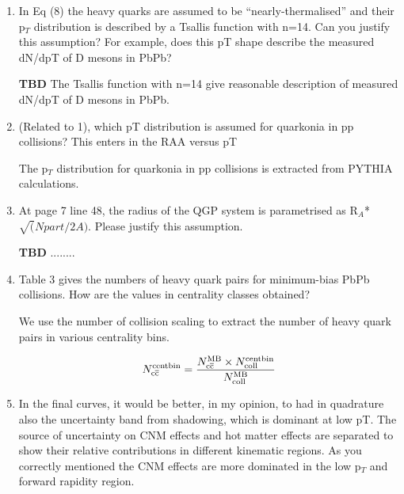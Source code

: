 \documentclass[a4paper,11pt]{article}
\begin{document}
\begin{enumerate}

\item In Eq (8) the heavy quarks are assumed to be “nearly-thermalised” and their p$_T$ distribution is described by a
  Tsallis function with n=14. Can you justify this assumption? For example, does this pT shape describe the measured dN/dpT
  of D mesons in PbPb?

{\color{red} \textbf{TBD} The Tsallis function with n=14 give reasonable description of measured dN/dpT
  of D mesons in PbPb. } 


\item (Related to 1), which pT distribution is assumed for quarkonia in pp collisions? This enters in the RAA versus pT

{\color{blue} The p$_T$ distribution for quarkonia in pp collisions is extracted from PYTHIA calculations. }

\item At page 7 line 48, the radius of the QGP system is parametrised as R$_A$*$\sqrt(Npart/2A)$. Please justify this assumption.\newline

  {\color{red} \textbf{TBD} ........}

\item Table 3 gives the numbers of heavy quark pairs for minimum-bias PbPb collisions. How are the values in centrality classes obtained?\newline
  
  {\color{blue} We use the number of collision scaling to extract the number of heavy quark pairs in various centrality bins. 
    
    \begin{equation}
      N_{\rm c\overline{c}}^{\rm centbin} = \frac{N_{\rm c\overline{c}}^{\rm MB}\times N_{\rm coll}^{\rm centbin}}{N_{\rm coll}^{\rm MB}} 
    \end{equation}
  }

\item In the final curves, it would be better, in my opinion, to had in quadrature also the uncertainty band from shadowing, which is dominant at low pT. \newline
  {\color{blue}
    The source of uncertainty on CNM effects and hot matter effects are separated to show their relative contributions in different kinematic regions.
    As you correctly mentioned the CNM effects are more dominated in the low p$_{T}$ and forward rapidity region.  
  }



\end{enumerate}
\end{document}
